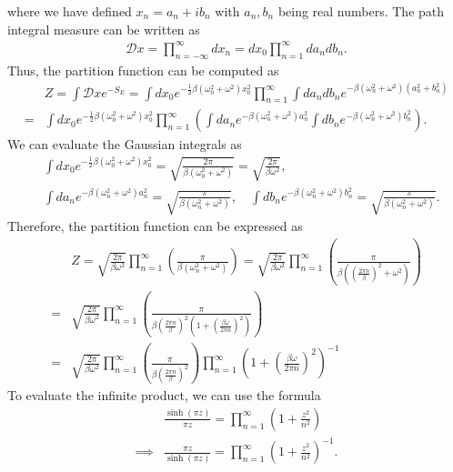 where we have defined $x_n = a_n + i b_n$ with $a_n, b_n$ being real numbers. The path integral measure can be written as
\begin{align}
    \mathcal{D}x = \prod_{n=-\infty}^{\infty} dx_n = dx_0 \prod_{n=1}^{\infty} da_n db_n.
\end{align}
Thus, the partition function can be computed as
\begin{align}
    &Z = \int \mathcal{D}x e^{-S_E} = \int dx_0 e^{-\frac{1}{2} \beta(\omega_0^2 + \omega^2) x_0^2} \prod_{n=1}^{\infty} \int da_n db_n e^{-\beta\left( \omega_n^2 + \omega^2 \right) (a_n^2 + b_n^2)}\\
    =&\int dx_0 e^{-\frac{1}{2} \beta(\omega_0^2 + \omega^2) x_0^2}\prod_{n=1}^{\infty} \left( \int da_n e^{-\beta\left( \omega_n^2 + \omega^2 \right) a_n^2} \int db_n e^{-\beta\left( \omega_n^2 + \omega^2 \right) b_n^2} \right).
\end{align}
We can evaluate the Gaussian integrals as
\begin{align}
    &\int dx_0 e^{-\frac{1}{2} \beta(\omega_0^2 + \omega^2) x_0^2} = \sqrt{\frac{2\pi}{\beta(\omega_0^2 + \omega^2)}} = \sqrt{\frac{2\pi}{\beta\omega^2}}, \\
    &\int da_n e^{-\beta\left( \omega_n^2 + \omega^2 \right) a_n^2} = \sqrt{\frac{\pi}{\beta(\omega_n^2 + \omega^2)}}, \quad \int db_n e^{-\beta\left( \omega_n^2 + \omega^2 \right) b_n^2} = \sqrt{\frac{\pi}{\beta(\omega_n^2 + \omega^2)}}.
\end{align}
Therefore, the partition function can be expressed as
\begin{align}
    &Z = \sqrt{\frac{2\pi}{\beta\omega^2}} \prod_{n=1}^{\infty} \left( \frac{\pi}{\beta(\omega_n^2 + \omega^2)} \right) = \sqrt{\frac{2\pi}{\beta\omega^2}} \prod_{n=1}^{\infty} \left( \frac{\pi}{\beta\left( \left( \frac{2\pi n}{\beta} \right)^2 + \omega^2 \right)} \right)\\
    =&\sqrt{\frac{2\pi}{\beta\omega^2}} \prod_{n=1}^{\infty} \left( 
    \frac{\pi}{\beta\left(\frac{2\pi n}{\beta}\right)^2\left(
    1+\left(\frac{\beta\omega}{2\pi n}\right)^2
    \right)}\right)\\
    =&\sqrt{\frac{2\pi}{\beta\omega^2}} \prod_{n=1}^{\infty} \left( \frac{\pi}{\beta\left(\frac{2\pi n}{\beta}\right)^2} \right) \prod_{n=1}^{\infty} \left( 1 + \left( \frac{\beta\omega}{2\pi n} \right)^2 \right)^{-1}
\end{align}
To evaluate the infinite product, we can use the formula
\begin{align}
    &\frac{\sinh(\pi z)}{\pi z} = \prod_{n=1}^{\infty} \left( 1 + \frac{z^2}{n^2} \right)\\
    \implies& \frac{\pi z}{\sinh(\pi z)} = \prod_{n=1}^{\infty} \left( 1 + \frac{z^2}{n^2} \right)^{-1}.
\end{align}
